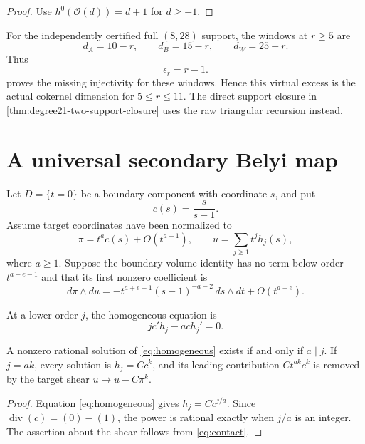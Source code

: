 \documentclass[11pt,reqno]{amsart}
\begin{document}
\begin{proof}
Use \(h^0(\mathcal O(d))=d+1\) for \(d\ge-1\).
\end{proof}

For the independently certified full \((8,28)\) support, the windows at
\(r\ge5\) are
\[
d_A=10-r,\qquad d_B=15-r,\qquad d_W=25-r.
\]
Thus
\[
\epsilon_r=r-1.
\]
 proves the missing injectivity for these
windows.  Hence this virtual excess is the actual cokernel dimension for
\(5\le r\le11\).  The direct support closure in
\cref{thm:degree21-two-support-closure} uses the raw triangular recursion
instead.

\section{A universal secondary Belyi map}
\label{sec:secondary}

Let \(D=\{t=0\}\) be a boundary component with coordinate \(s\), and put
\[
c(s)=\frac{s}{s-1}.
\]
Assume target coordinates have been normalized to
\begin{equation}
\label{eq:contact}
\pi=t^ac(s)+O(t^{a+1}),\qquad
u=\sum_{j\ge1}t^jh_j(s),
\end{equation}
where \(a\ge1\).  Suppose the boundary-volume identity has no term below
order \(t^{a+e-1}\) and that its first nonzero coefficient is
\begin{equation}
\label{eq:volume}
d\pi\wedge du
=-t^{a+e-1}(s-1)^{-a-2}\,ds\wedge dt
+O(t^{a+e}).
\end{equation}

At a lower order \(j\), the homogeneous equation is
\begin{equation}
\label{eq:homogeneous}
jc'h_j-ach_j'=0.
\end{equation}

\begin{lemma}
\label{lem:resonance}
A nonzero rational solution of \eqref{eq:homogeneous} exists if and only if
\(a\mid j\).  If \(j=ak\), every solution is \(h_j=Cc^k\), and its
leading contribution \(Ct^{ak}c^k\) is removed by the target shear
\(u\mapsto u-C\pi^k\).
\end{lemma}

\begin{proof}
Equation \eqref{eq:homogeneous} gives \(h_j=Cc^{j/a}\).  Since
\(\operatorname{div}(c)=(0)-(1)\), the power is rational exactly when
\(j/a\) is an integer.  The assertion about the shear follows from
\eqref{eq:contact}.
\end{proof}
\end{document}
